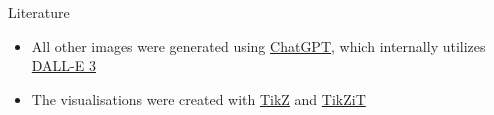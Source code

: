 \documentclass[aspectratio=169, hyperref={colorlinks=true, allcolors=SecondaryColor}, c]{beamer}
\begin{document}
	\begin{frame}[allowframebreaks]{Literature}
		\printbibliography
		\begin{itemize}
      \item All other images were generated using \href{https://chatgpt.com/}{ChatGPT}, which internally utilizes \href{https://openai.com/index/dall-e-3/}{DALL-E 3}
      \item The visualisations were created with \href{https://github.com/pgf-tikz/pgf?tab=readme-ov-file}{TikZ} and \href{https://tikzit.github.io/}{TikZiT}
		\end{itemize}
	\end{frame}


\else
\fi
\end{document}
